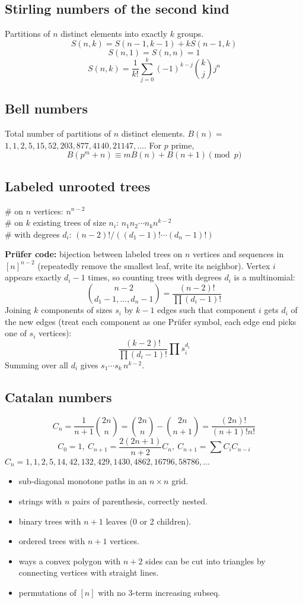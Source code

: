 	\subsection{Stirling numbers of the second kind}
		Partitions of $n$ distinct elements into exactly $k$ groups.
		$$S(n,k) = S(n-1,k-1) + k S(n-1,k)$$
		$$S(n,1) = S(n,n) = 1$$
		$$S(n,k) = \frac{1}{k!}\sum_{j=0}^k (-1)^{k-j}\binom{k}{j}j^n$$

	\subsection{Bell numbers}
		Total number of partitions of $n$ distinct elements. $B(n) =$
		$1, 1, 2, 5, 15, 52, 203, 877, 4140, 21147, \dots$. For $p$ prime,
		\[ B(p^m+n)\equiv mB(n)+B(n+1) \pmod{p} \]

	\subsection{Labeled unrooted trees}
		\# on $n$ vertices: $n^{n-2}$ \\
		\# on $k$ existing trees of size $n_i$: $n_1n_2\cdots n_k n^{k-2}$ \\
		\# with degrees $d_i$: $(n-2)! / ((d_1-1)! \cdots (d_n-1)!)$

		\textbf{Prüfer code:} bijection between labeled trees on $n$ vertices and sequences in $[n]^{n-2}$ (repeatedly remove the smallest leaf, write its neighbor). Vertex $i$ appears exactly $d_i - 1$ times, so counting trees with degrees $d_i$ is a multinomial:
		\[ \binom{n-2}{d_1-1, \dots, d_n-1} = \frac{(n-2)!}{\prod (d_i-1)!} \]
		Joining $k$ components of sizes $s_i$ by $k-1$ edges such that component $i$ gets $d_i$ of the new edges (treat each component as one Prüfer symbol, each edge end picks one of $s_i$ vertices):
		\[ \frac{(k-2)!}{\prod (d_i-1)!} \prod s_i^{d_i} \]
		Summing over all $d_i$ gives $s_1 \cdots s_k \, n^{k-2}$.

	\subsection{Catalan numbers}
		\[ C_n=\frac{1}{n+1}\binom{2n}{n}= \binom{2n}{n}-\binom{2n}{n+1} = \frac{(2n)!}{(n+1)!n!} \]
		\[ C_0=1,\ C_{n+1} = \frac{2(2n+1)}{n+2}C_n,\ C_{n+1}=\sum C_iC_{n-i} \]
		${C_n = 1, 1, 2, 5, 14, 42, 132, 429, 1430, 4862, 16796, 58786, \dots}$
		\begin{itemize}[noitemsep]
			\item sub-diagonal monotone paths in an $n\times n$ grid.
			\item strings with $n$ pairs of parenthesis, correctly nested.
			\item binary trees with $n+1$ leaves (0 or 2 children).
			\item ordered trees with $n+1$ vertices.
			\item ways a convex polygon with $n+2$ sides can be cut into triangles by connecting vertices with straight lines.
			\item permutations of $[n]$ with no 3-term increasing subseq.
		\end{itemize}
	
